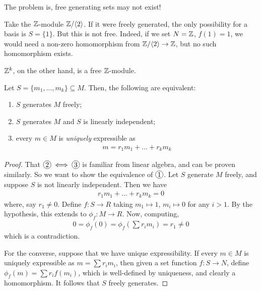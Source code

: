 \documentclass{../../template/note}
\begin{document}
    The problem is, free generating sets may not exist!

    \begin{example*}
        Take the $\mathbb Z$-module $\mathbb Z/\!\left \langle 2 \right \rangle$. If it were freely generated, the only possibility for a basis is $S = \{1\}$. But this is not free. Indeed, if we set $N = \mathbb Z$, $f(1) = 1$, we would need a non-zero homomorphism from $\mathbb Z /\!\left \langle 2 \right \rangle \to \mathbb Z$, but no such homomorphism exists.
    \end{example*}
    
    \begin{remark*}
        $\mathbb Z^k$, on the other hand, is a free $\mathbb Z$-module.
    \end{remark*}
    
    \begin{proposition}
        Let $S = \{m_1, \dots, m_k\} \subseteq M$. Then, the following are equivalent:
        \begin{enumerate}[label=\protect\circled{\arabic*}]
            \item $S$ generates $M$ freely;
            \item $S$ generates $M$ and $S$ is linearly independent;
            \item every $m \in M$ is \emph{uniquely} expressible as
            \begin{align*}
                m = r_1m_1 + \dots + r_km_k
            \end{align*}
        \end{enumerate}
    \end{proposition}
    
    \begin{proof}
        That $\circled 2 \iff \circled 3$ is familiar from linear algebra, and can be proven similarly. So we want to show the equivalence of $\circled 1$. Let $S$ generate $M$ freely, and suppose $S$ is not linearly independent. Then we have
        \begin{align*}
            r_1m_1 + \dots + r_km_k = 0
        \end{align*}
        where, say $r_1 \neq 0$. Define $f: S \to R$ taking $m_1 \mapsto 1$, $m_i \mapsto 0$ for any $i > 1$. By the hypothesis, this extends to $\phi_f: M \to R$. Now, computing,
        \begin{align*}
            0 = \phi_f(0) = \phi_f\left(\sum r_im_i\right) = r_1 \neq 0
        \end{align*}
        which is a contradiction.

        For the converse, suppose that we have unique expressibility. If every $m \in M$ is uniquely expressible as $m = \sum r_i m_i$, then given a set function $f: S \to N$, define $\phi_f(m) = \sum r_i f(m_i)$, which is well-defined by uniqueness, and clearly a homomorphism. It follows that $S$ freely generates.        
    \end{proof}
    
\end{document}
